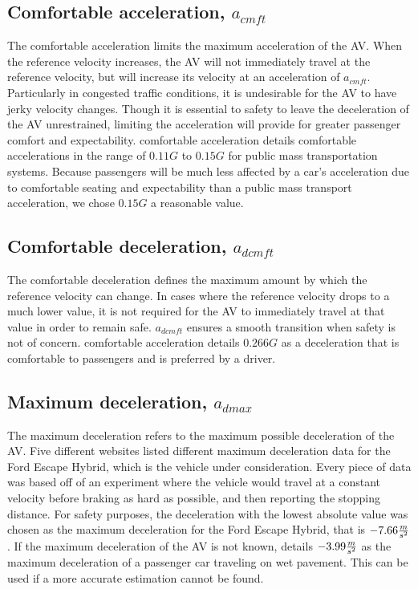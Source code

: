 \documentclass[conference]{IEEEtran}
\begin{document}
\subsection{Comfortable acceleration, $a_{cmft}$}
The comfortable acceleration limits the maximum acceleration of the AV. When the reference velocity increases, the AV will not immediately travel at the reference velocity, but will increase its velocity at an acceleration of $a_{cmft}$. Particularly in congested traffic conditions, it is undesirable for the AV to have jerky velocity changes. Though it is essential to safety to leave the deceleration of the AV unrestrained, limiting the acceleration will provide for greater passenger comfort and expectability. {comfortable acceleration} details comfortable accelerations in the range of $0.11G$ to $0.15G$ for public mass transportation systems. Because passengers will be much less affected by a car's acceleration due to comfortable seating and expectability than a public mass transport acceleration, we chose $0.15G$ a reasonable value.

\subsection{Comfortable deceleration, $a_{dcmft}$}
The comfortable deceleration defines the maximum amount by which the reference velocity can change. In cases where the reference velocity drops to a much lower value, it is not required for the AV to immediately travel at that value in order to remain safe. $a_{dcmft}$ ensures a smooth transition when safety is not of concern. {comfortable acceleration} details $0.266G$ as a deceleration that is comfortable to passengers and is preferred by a driver.

\subsection{Maximum deceleration, $a_{dmax}$}
The maximum deceleration refers to the maximum possible deceleration of the AV. Five different websites \cite{max decel 1,max decel 2,max decel 3, max decel 4, max decel 5} listed different maximum deceleration data for the Ford Escape Hybrid, which is the vehicle under consideration. Every piece of data was based off of an experiment where the vehicle would travel at a constant velocity before braking as hard as possible, and then reporting the stopping distance. For safety purposes, the deceleration with the lowest absolute value was chosen as the maximum deceleration for the Ford Escape Hybrid, that is $-7.66{m\over s^2}$ \cite{max decel 3}. If the maximum deceleration of the AV is not known, \cite{Fambro} details $-3.99{m\over s^2}$ as the maximum deceleration of a passenger car traveling on wet pavement. This can be used if a more accurate estimation cannot be found.
\end{document}
